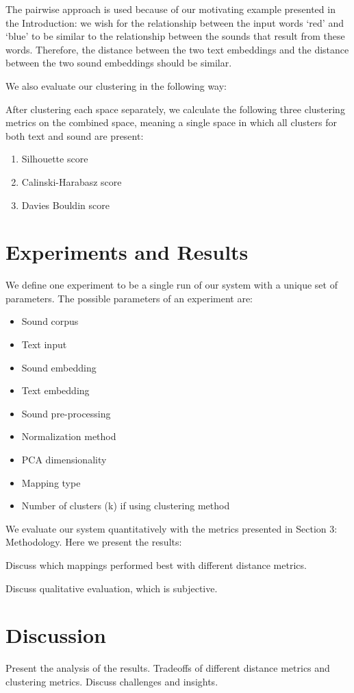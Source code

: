 \documentclass[twoside,a4paper]{article}
\begin{document}
The pairwise approach is used because of our motivating example presented in the Introduction: we wish for the relationship between the input words ‘red’ and ‘blue’ to be similar to the relationship between the sounds that result from these words. Therefore, the distance between the two text embeddings and the distance between the two sound embeddings should be similar.

We also evaluate our clustering in the following way:

After clustering each space separately, we calculate the following three clustering metrics on the combined space, meaning a single space in which all clusters for both text and sound are present:
\begin{enumerate}
    \item Silhouette score
    \item Calinski-Harabasz score
    \item Davies Bouldin score
\end{enumerate}

\section{Experiments and Results}
We define one experiment to be a single run of our system with a unique set of parameters. The possible parameters of an experiment are:
\begin{itemize}
    \item Sound corpus
    \item Text input
    \item Sound embedding
    \item Text embedding
    \item Sound pre-processing
    \item Normalization method
    \item PCA dimensionality
    \item Mapping type
    \item Number of clusters (k) if using clustering method
\end{itemize}

We evaluate our system quantitatively with the metrics presented in Section 3: Methodology. Here we present the results:

Discuss which mappings performed best with different distance metrics.

Discuss qualitative evaluation, which is subjective.

\section{Discussion}
Present the analysis of the results. Tradeoffs of different distance metrics and clustering metrics. Discuss challenges and insights.
\end{document}
